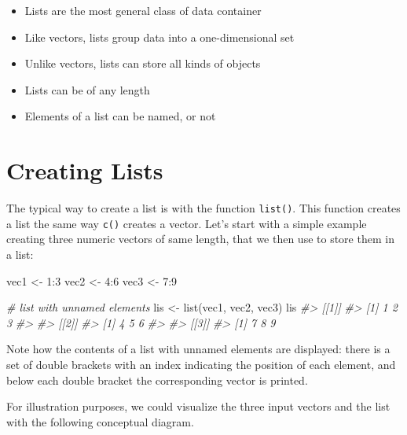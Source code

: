 \documentclass[
]{book}
\newenvironment{Shaded}{\begin{snugshade}}{\end{snugshade}}
\newcommand{\CommentTok}[1]{\textcolor[rgb]{0.56,0.35,0.01}{\textit{#1}}}
\newcommand{\DecValTok}[1]{\textcolor[rgb]{0.00,0.00,0.81}{#1}}
\newcommand{\FunctionTok}[1]{\textcolor[rgb]{0.00,0.00,0.00}{#1}}
\newcommand{\NormalTok}[1]{#1}
\newcommand{\OtherTok}[1]{\textcolor[rgb]{0.56,0.35,0.01}{#1}}
\newcommand{\SpecialCharTok}[1]{\textcolor[rgb]{0.00,0.00,0.00}{#1}}
\providecommand{\tightlist}{%
  \setlength{\itemsep}{0pt}\setlength{\parskip}{0pt}}
\begin{document}
\begin{itemize}
\tightlist
\item
  Lists are the most general class of data container
\item
  Like vectors, lists group data into a one-dimensional set
\item
  Unlike vectors, lists can store all kinds of objects
\item
  Lists can be of any length
\item
  Elements of a list can be named, or not
\end{itemize}

\hypertarget{creating-lists}{%
\section{Creating Lists}\label{creating-lists}}

The typical way to create a list is with the function \texttt{list()}. This function
creates a list the same way \texttt{c()} creates a vector. Let's start with a simple
example creating three numeric vectors of same length, that we then use to
store them in a list:

\begin{Shaded}
\begin{Highlighting}[]
\NormalTok{vec1 }\OtherTok{\textless{}{-}} \DecValTok{1}\SpecialCharTok{:}\DecValTok{3}
\NormalTok{vec2 }\OtherTok{\textless{}{-}} \DecValTok{4}\SpecialCharTok{:}\DecValTok{6}
\NormalTok{vec3 }\OtherTok{\textless{}{-}} \DecValTok{7}\SpecialCharTok{:}\DecValTok{9}

\CommentTok{\# list with unnamed elements}
\NormalTok{lis }\OtherTok{\textless{}{-}} \FunctionTok{list}\NormalTok{(vec1, vec2, vec3)}
\NormalTok{lis}
\CommentTok{\#\textgreater{} [[1]]}
\CommentTok{\#\textgreater{} [1] 1 2 3}
\CommentTok{\#\textgreater{} }
\CommentTok{\#\textgreater{} [[2]]}
\CommentTok{\#\textgreater{} [1] 4 5 6}
\CommentTok{\#\textgreater{} }
\CommentTok{\#\textgreater{} [[3]]}
\CommentTok{\#\textgreater{} [1] 7 8 9}
\end{Highlighting}
\end{Shaded}

Note how the contents of a list with unnamed elements are displayed: there is a
set of double brackets with an index indicating the position of each element,
and below each double bracket the corresponding vector is printed.

For illustration purposes, we could visualize the three input vectors and the
list with the following conceptual diagram.
\end{document}

